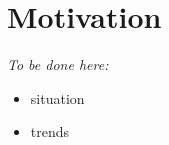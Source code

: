 \section{Motivation}\label{s:motivation}
    \emph{To be done here:}
    \begin{itemize}
        \item situation
        \item trends
    \end{itemize}